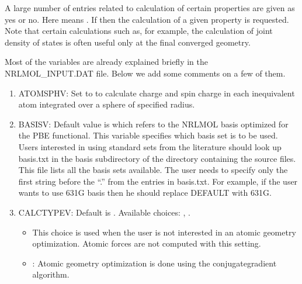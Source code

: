 \documentclass[letterpaper,10pt,english,openany,oneside]{sphinxmanual}
\begin{document}
\sphinxAtStartPar
A large number of entries related to calculation of certain properties are given as yes or no. Here  means . If  then the calculation of a given property is requested. Note that certain calculations such as, for example, the calculation of joint density of states is often useful only at the final converged geometry.

\sphinxAtStartPar
Most of the variables are already explained briefly in the NRLMOL\_INPUT.DAT file. Below we add some comments on a few of them.
\begin{enumerate}
%
\item {} 
\sphinxAtStartPar
ATOMSPHV: Set to  to calculate charge and spin charge in each inequivalent atom integrated over a sphere of specified  radius.

\item {} 
\sphinxAtStartPar
BASISV: Default value is  which refers to the NRLMOL basis optimized for the PBE functional.
This variable specifies which basis set is to be used. Users interested in using standard sets from the literature should look up basis.txt in the basis
subdirectory of the directory containing the source files. This file lists all the basis sets available. The user
needs to specify only the first string before the “.” from the entries in basis.txt. For example, if the user
wants to use 6\sphinxhyphen{}31G basis then he should replace DEFAULT with 6\sphinxhyphen{}31G.

\item {} 
\sphinxAtStartPar
CALCTYPEV:   Default is .
Available choices:  , .
\begin{itemize}
\item {} 
\sphinxAtStartPar
{} This choice is used when the user is not interested in an atomic geometry optimization. Atomic forces are not computed with this setting.

\item {} 
\sphinxAtStartPar
{} : Atomic geometry optimization is done using the conjugate\sphinxhyphen{}gradient algorithm.

\end{itemize}


\end{enumerate}
\end{document}
